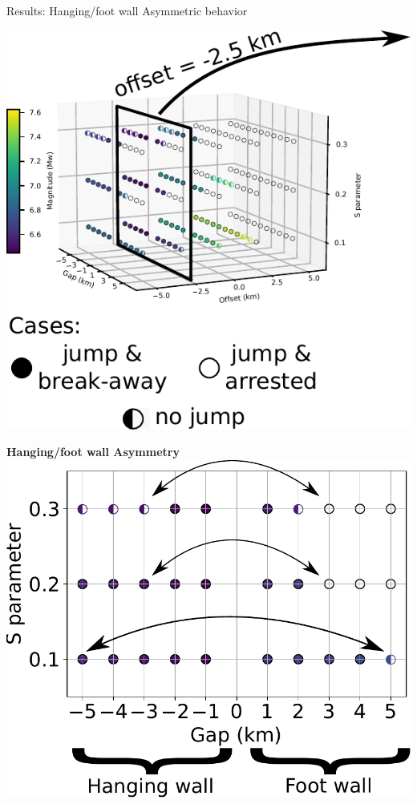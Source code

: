 \documentclass{beamer}
\begin{document}
\begin{frame}
 {Results: Hanging/foot wall Asymmetric behavior}
 
 \begin{minipage}{0.45\linewidth}
  \includegraphics[width=1\linewidth]{images/tests_shmax340_1plane2}
 \end{minipage} \pause
 \begin{minipage}{0.5\linewidth}
  \vskip 0.2cm
  \begin{center}
  \textbf{Hanging/foot wall Asymmetry}
  \vskip 0.2cm
  \includegraphics[width=0.9\linewidth]{images/tests_asym} \pause   

\end{center}
\end{minipage}
\end{frame}
\end{document}
